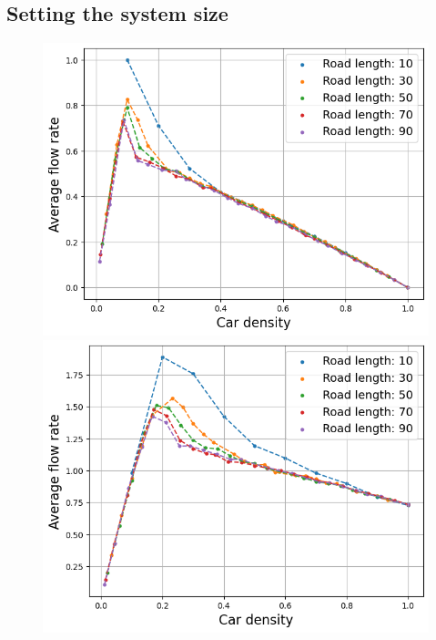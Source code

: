 \documentclass[a4paper,12pt]{article}
\begin{document}
\subsection*{Setting the system size}
\begin{figure}[H]
    \centering
    \begin{minipage}{.5\textwidth}
        \centering
        \includegraphics[scale=0.47]{Images/fundamental diagrams 1 lane.png}
    \end{minipage}%
    \begin{minipage}{.5\textwidth}
        \centering
        \includegraphics[scale=0.47]{Images/fundamental diagrams 2 lanes.png}

\end{minipage}
\end{figure}
\end{document}
